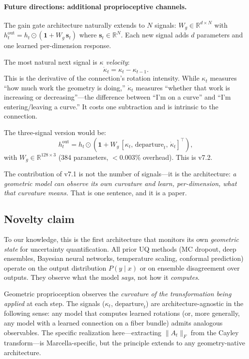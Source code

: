 \documentclass[11pt,a4paper]{article}
\theoremstyle{definition}
\theoremstyle{remark}
\begin{document}
\paragraph{Future directions: additional proprioceptive channels.}
The gain gate architecture naturally extends to $N$ signals: 
$W_g \in \mathbb{R}^{d \times N}$ with 
$h_t^{\mathrm{out}} = h_t \odot (\mathbf{1} + W_g\,\mathbf{s}_t)$ 
where $\mathbf{s}_t \in \mathbb{R}^N$. Each new signal adds $d$ 
parameters and one learned per-dimension response.

The most natural next signal is \emph{$\kappa$ velocity}:
\begin{equation}\label{eq:kappa_dot}
    \dot{\kappa}_t = \kappa_t - \kappa_{t-1}.
\end{equation}
This is the derivative of the connection's rotation intensity. 
While $\kappa_t$ measures ``how much work the geometry is doing,'' 
$\dot{\kappa}_t$ measures ``whether that work is increasing or 
decreasing''---the difference between ``I'm on a curve'' and 
``I'm entering/leaving a curve.'' It costs one subtraction and 
is intrinsic to the connection.

The three-signal version would be:
\[
    h_t^{\mathrm{out}} = h_t \odot \left(\mathbf{1} + 
    W_g\,[\kappa_t,\,\mathrm{departure}_t,\,\dot{\kappa}_t]^\top\right),
\]
with $W_g \in \mathbb{R}^{128 \times 3}$ (384 parameters, 
$< 0.003\%$ overhead). This is v7.2.

The contribution of v7.1 is not the number of signals---it is 
the architecture: \emph{a geometric model can observe its own 
curvature and learn, per-dimension, what that curvature means.} 
That is one sentence, and it is a paper.

\subsection{Novelty claim}\label{sec:proprio_novelty}

To our knowledge, this is the first architecture that monitors 
its own \emph{geometric state} for uncertainty quantification. 
All prior UQ methods (MC dropout, deep ensembles, Bayesian neural 
networks, temperature scaling, conformal prediction) operate on 
the output distribution $P(y \mid x)$ or on ensemble disagreement 
over outputs. They observe what the model \emph{says}, not how it 
\emph{computes}.

Geometric proprioception observes the \emph{curvature of the 
transformation being applied} at each step. The signals 
($\kappa_t$, $\mathrm{departure}_t$) are architecture-agnostic 
in the following sense: any model that computes learned rotations 
(or, more generally, any model with a learned connection on a 
fiber bundle) admits analogous observables. The specific 
realization here---extracting $\|A_t\|_F$ from the Cayley 
transform---is Marcella-specific, but the principle extends to 
any geometry-native architecture.
\end{document}
